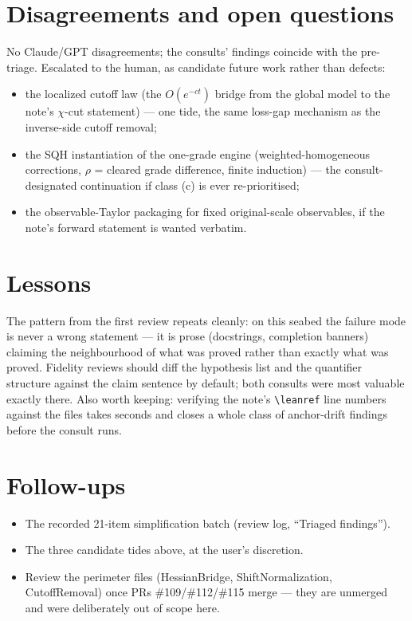 \documentclass[11pt]{article}
\begin{document}
\section{Disagreements and open questions}

No Claude/GPT disagreements; the consults' findings coincide with the
pre-triage. Escalated to the human, as candidate future work rather
than defects:
\begin{itemize}[nosep]
\item the localized cutoff law (the $O(e^{-ct})$ bridge from the
global model to the note's $\chi$-cut statement) --- one tide, the
same loss-gap mechanism as the inverse-side cutoff removal;
\item the SQH instantiation of the one-grade engine
(weighted-homogeneous corrections, $\rho$ = cleared grade difference,
finite induction) --- the consult-designated continuation if class (c)
is ever re-prioritised;
\item the observable-Taylor packaging for fixed original-scale
observables, if the note's forward statement is wanted verbatim.
\end{itemize}

\section{Lessons}

The pattern from the first review repeats cleanly: on this seabed the
failure mode is never a wrong statement --- it is prose (docstrings,
completion banners) claiming the neighbourhood of what was proved
rather than exactly what was proved. Fidelity reviews should diff the
hypothesis list and the quantifier structure against the claim
sentence by default; both consults were most valuable exactly there.
Also worth keeping: verifying the note's \verb|\leanref| line numbers
against the files takes seconds and closes a whole class of
anchor-drift findings before the consult runs.

\section{Follow-ups}

\begin{itemize}[nosep]
\item The recorded 21-item simplification batch (review log,
``Triaged findings'').
\item The three candidate tides above, at the user's discretion.
\item Review the perimeter files (HessianBridge, ShiftNormalization,
CutoffRemoval) once PRs \#109/\#112/\#115 merge — they are unmerged
and were deliberately out of scope here.
\end{itemize}
\end{document}

